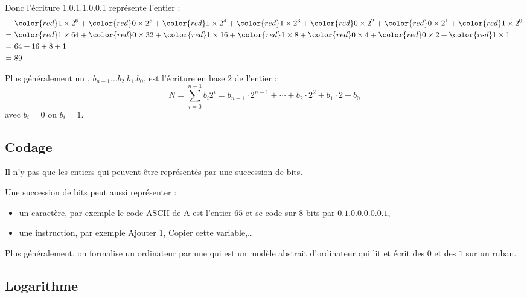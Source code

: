 \documentclass[11pt,class=report,crop=false]{standalone}
\begin{document}
    Donc l'écriture {\color{red}1}.{\color{red}0}.{\color{red}1}.{\color{red}1}.{\color{red}0}.{\color{red}0}.{\color{red}1} représente l'entier : 
    \begin{align*}
    & {\color{red}1} \times 2^6  + {\color{red}0} \times 2^5 + {\color{red}1} \times 2^4  + {\color{red}1} \times 2^3 + {\color{red}0} \times 2^2 + {\color{red}0} \times 2^1 + {\color{red}1} \times 2^0 \\    
    =\ & {\color{red}1} \times 64  + {\color{red}0} \times 32 + {\color{red}1} \times 16  + {\color{red}1} \times 8 + {\color{red}0} \times 4 + {\color{red}0} \times 2 + {\color{red}1} \times 1 \\
    =\ & 64 + 16 + 8 + 1 \\
    =\ & 89
    \end{align*}

Plus généralement un , $b_{n-1}\ldots b_2.b_1.b_0$, est l'écriture en base $2$ de l'entier :
$$N = \sum_{i=0}^{n-1}b_i 2^i = b_{n-1} \cdot 2^{n-1} + \cdots + b_2  \cdot 2^2 + b_1  \cdot 2 + b_0$$
avec $b_i = 0$ ou $b_i=1$.
    
\subsection{Codage}

Il n'y pas que les entiers qui peuvent être représentés par une succession de bits.

Une succession de bits peut aussi représenter :
\begin{itemize}
  \item un caractère, par exemple le code ASCII de \og{}A\fg{} est l'entier $65$ et se code sur $8$ bits par $0.1.0.0.0.0.0.1$,
  
  \item une instruction, par exemple \og{}Ajouter 1\fg{}, \og{}Copier cette variable\fg{},\ldots
\end{itemize}

Plus généralement, on formalise un ordinateur par une  qui est un modèle abstrait d'ordinateur qui lit et écrit des $0$ et des $1$ sur un ruban.

\subsection{Logarithme}
\end{document}
